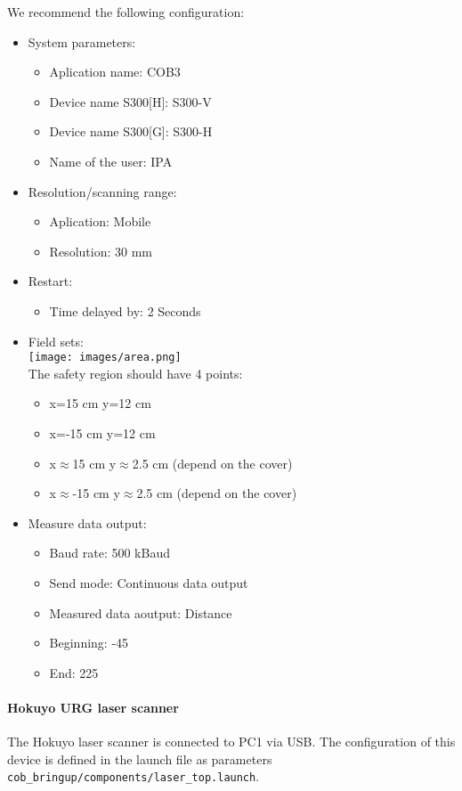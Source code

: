 We recommend the following configuration:
\begin{itemize}
\item System parameters:
\begin{itemize}
\item Aplication name: COB3
\item Device name S300[H]: S300-V
\item Device name S300[G]: S300-H
\item Name of the user: IPA
\end{itemize}
\item Resolution/scanning range:
\begin{itemize}
\item Aplication: Mobile
\item Resolution: 30 mm
\end{itemize}
\item Restart:
\begin{itemize}
\item Time delayed by: 2 Seconds
\end{itemize}
\item Field sets:
\\
\texttt{[image: images/area.png]}
\\ The safety region should have 4 points:
\begin{itemize}
\item x=15 cm y=12 cm
\item x=-15 cm y=12 cm
\item x$\approx$15 cm y$\approx$2.5 cm (depend on the cover)
\item x$\approx$-15 cm y$\approx$2.5 cm (depend on the cover)
\end{itemize}
\item Measure data output:
\begin{itemize}
\item Baud rate: 500 kBaud
\item Send mode: Continuous data output
\item Measured data aoutput: Distance
\item Beginning: -45
\item End: 225
\end{itemize}
\end{itemize}

\paragraph{Hokuyo URG laser scanner}
The Hokuyo laser scanner is connected to PC1 via USB. The configuration of this device is defined in the launch file as parameters \texttt{cob\_bringup/components/laser\_top.launch}.

